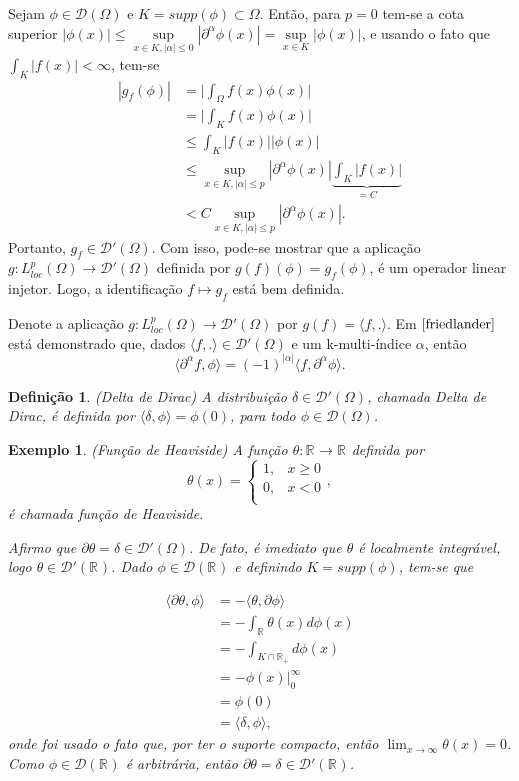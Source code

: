 \documentclass[12pt]{book}
\newtheorem{definicao}[teorema]{Definição}
\newtheorem{exemplo}[teorema]{Exemplo}
\newcommand{\distribuicoes}{\distribuicoesgeral{\Omega}}
\newcommand{\distribuicoesgeral}[1]{\mathcal{D'}(#1)}
\newcommand{\espacoLpcomp}[1]{L^{p}_{loc}(#1)}
\newcommand{\funcaocond}[5]{
	#1 = 
	\left\{
	\begin{array}{cc}
		#2, & #3\\
		#4, & #5\\
	\end{array}
	\right.
}
\newcommand{\funcoesteste}{\funcoestestegeral{\Omega}}
\newcommand{\funcoestestegeral}[1]{\mathcal{D}(#1)}
\newcommand{\produtointerno}[2]{\langle #1, #2 \rangle}
\newcommand{\real}[1]{\mathbb{R}^{#1}}
\newcommand{\reta}{\real{}}
\begin{document}
	Sejam $\phi \in \funcoesteste$ e $K = supp(\phi) \subset \Omega$. Então, para $p=0$ tem-se a cota superior $|\phi(x)|\leq \sup\limits_{x\in K, |\alpha|\leq 0}|\partial^{\alpha}\phi(x)| = \sup\limits_{x\in K}|\phi(x)|$, e usando o fato que $\int_{K}|f(x)|<\infty$, tem-se
	$$
	\begin{aligned}
	|g_{f}(\phi)|
	&=\Big|\int_{\Omega}f(x)\phi(x)\Big|
	\\
	&=\Big|\int_{K}f(x)\phi(x)\Big|
	\\
	&\leq \int_{K}|f(x)||\phi(x)|
	\\
	&\leq \sup\limits_{x\in K, |\alpha|\leq p}|\partial^{\alpha}\phi(x)|\underbrace{\int_{K}|f(x)|}_{=C}
	\\
	&< C\sup\limits_{x\in K, |\alpha|\leq p}|\partial^{\alpha}\phi(x)|.
	\end{aligned}
	$$
	Portanto, $g_{f} \in \distribuicoes$. Com isso, pode-se mostrar que a aplicação $g:\espacoLpcomp{\Omega}\to \distribuicoesgeral{\Omega}$ definida por $g(f)(\phi) = g_{f}(\phi)$, é um operador linear injetor. Logo, a identificação $f \mapsto g_{f}$ está bem definida. 
	
	Denote a aplicação $g:\espacoLpcomp{\Omega}\to \distribuicoesgeral{\Omega}$ por $g(f)=\produtointerno{f}{.}$. Em $\cite{friedlander}$ está demonstrado que, dados $\produtointerno{f}{.} \in \distribuicoes$ e um k-multi-índice $\alpha$, então
	$$
	\produtointerno{\partial^{\alpha}f}{\phi} = (-1)^{|\alpha|}\produtointerno{f}{\partial^{\alpha}\phi}.
	$$
	
	\begin{definicao}
		(Delta de Dirac) A distribuição $\delta \in \distribuicoes$, chamada Delta de Dirac, é definida por $\produtointerno{\delta}{\phi} = \phi(0)$, para todo $\phi \in \funcoesteste$.
	\end{definicao}
	
	\begin{exemplo}
		(Função de Heaviside) A função $\theta:\reta \to \reta$ definida por
		$$
		\funcaocond{\theta(x)}{1}{x\geq0}{0}{x<0},
		$$
		é chamada  função de Heaviside.
		
		Afirmo que $\partial\theta = \delta \in \distribuicoes$. De fato, é imediato que $\theta$ é localmente integrável, logo $\theta \in \distribuicoesgeral{\reta}$. Dado $\phi \in \funcoestestegeral{\reta}$ e definindo $K=supp(\phi)$, tem-se que 
		
		$$
		\begin{aligned}
		\produtointerno{\partial\theta}{\phi} 
		&= -\produtointerno{\theta}{\partial\phi} 
		\\
		&=-\int_{\reta}\theta(x)d\phi(x)
		\\
		&= -\int_{K\cap\reta_{+}}  d\phi(x) 
		\\
		&= -\phi(x)\Big|^{\infty}_{0} 
		\\
		&= \phi(0) 
		\\
		&= \produtointerno{\delta}{\phi},
		\end{aligned}
		$$
		onde foi usado o fato que, por ter o suporte compacto, então $\lim_{x\to \infty}\theta(x)=0$.
		Como $\phi \in \funcoestestegeral{\reta}$ é arbitrária, então $\partial \theta = \delta \in \distribuicoesgeral{\reta}$.
	\end{exemplo}
	
\end{document}
